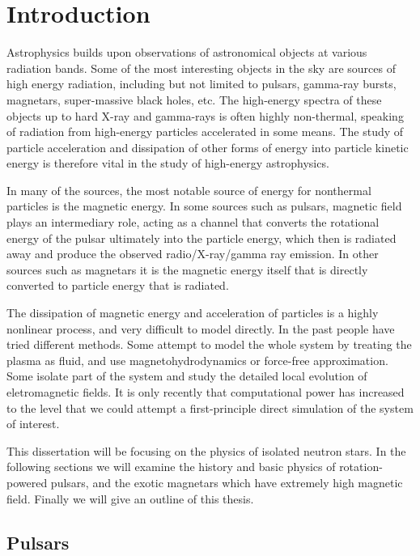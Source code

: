 
\chapter{Introduction}
\label{chap:intro}

Astrophysics builds upon observations of astronomical objects at various
radiation bands. Some of the most interesting objects in the sky are sources of
high energy radiation, including but not limited to pulsars, gamma-ray bursts,
magnetars, super-massive black holes, etc. The high-energy spectra of these
objects up to hard X-ray and gamma-rays is often highly non-thermal, speaking of
radiation from high-energy particles accelerated in some means. The study of
particle acceleration and dissipation of other forms of energy into particle
kinetic energy is therefore vital in the study of high-energy astrophysics.

In many of the sources, the most notable source of energy for nonthermal
particles is the magnetic energy. In some sources such as pulsars, magnetic
field plays an intermediary role, acting as a channel that converts the
rotational energy of the pulsar ultimately into the particle energy, which then
is radiated away and produce the observed radio/X-ray/gamma ray emission. In
other sources such as magnetars it is the magnetic energy itself that is
directly converted to particle energy that is radiated.

The dissipation of magnetic energy and acceleration of particles is a highly
nonlinear process, and very difficult to model directly. In the past people have
tried different methods. Some attempt to model the whole system by treating the
plasma as fluid, and use magnetohydrodynamics or force-free approximation. Some
isolate part of the system and study the detailed local evolution of
eletromagnetic fields. It is only recently that computational power has
increased to the level that we could attempt a first-principle direct simulation
of the system of interest.

This dissertation will be focusing on the physics of isolated neutron stars. In
the following sections we will examine the history and basic physics of
rotation-powered pulsars, and the exotic magnetars which have extremely high
magnetic field. Finally we will give an outline of this thesis.

\section{Pulsars}
\label{sec:intro-pulsars}

